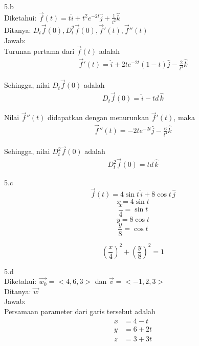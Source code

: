 \documentclass{article}
\begin{document}
    5.b \\
    Diketahui: \(\vec f(t) = t \hat i + t^2 e^{-2t} \hat j + \frac{1}{t^2} \hat k \) \\
    Ditanya: \(D_t \vec f (0), D_t^2 \vec f (0), \vec f' (t), \vec f''(t) \) \\
    Jawab: \\
    Turunan pertama dari \(\vec f(t)\) adalah \\
    \begin{displaymath}
        \begin{split}
            \vec f' (t) = \hat i + 2t e^{-2t} (1 - t) \hat j - \frac{2}{t^3} \hat k
        \end{split}
    \end{displaymath}

    Sehingga, nilai \(D_t \vec f(0)\) adalah
    \begin{displaymath}
        \begin{split}
            D_t \vec f(0) = \hat i - td \, \hat k
        \end{split}
    \end{displaymath}

    Nilai \(\vec f'' (t) \) didapatkan dengan menurunkan \(\vec f' (t) \), maka
    \begin{displaymath}
        \begin{split}
            \vec f'' (t) = - 2t e^{-2t} \hat j - \frac{6}{t^4} \hat k
        \end{split}
    \end{displaymath}

    Sehingga, nilai \(D_t^2 \vec f(0)\) adalah
    \begin{displaymath}
        \begin{split}
            D_t^2 \vec f(0) = td \, \hat k
        \end{split}
    \end{displaymath}

    5.c\\
    $$\vec f(t) = 4 \sin t \, \hat i + 8 \cos t \, \hat j$$
    $$x = 4 \sin t$$
    $$\frac{x}{4} = \sin t$$
    $$y = 8 \cos t$$
    $$\frac{y}{8} = \cos t$$

    $$(\frac{x}{4})^2 + (\frac{y}{8})^2 = 1$$

    5.d \\
    Diketahui: \(\vec{w_0} = <4, 6, 3>\) dan \(\vec v = <-1, 2, 3>\) \\
    Ditanya: \(\vec w\) \\
    Jawab: \\
    Persamaan parameter dari garis tersebut adalah
    \begin{displaymath}
        \begin{split}
            x &= 4 - t \\
            y &= 6 + 2t \\
            z &= 3 + 3t
        \end{split}
    \end{displaymath}
\end{document}

